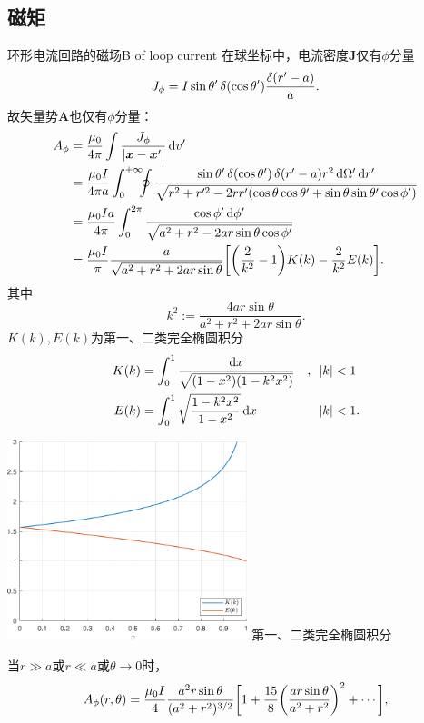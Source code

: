 \subsection{磁矩}
\begin{example}{环形电流回路的磁场}{B of loop current}
    在球坐标中，电流密度$\bm J$仅有$\phi$分量
    \[
        J_\phi=I\sin\theta'\mathop{}\!\delta(\cos\theta')\frac{\delta(r'-a)}a.
    \]
    故矢量势$\bm A$也仅有$\phi$分量：
    \begin{align*}
        A_\phi&=\frac{\mu_0}{4\pi}\int\frac{J_\phi}{|\bm x-\bm x'|}\d v'\\
        &=\frac{\mu_0I}{4\pi a}\int\zti\bs5\oint\frac{\sin\theta'\vd(\cos\theta')\vd(r'-a)r^2\d\Omega'\d r'}{\sqrt{r^2+r'^2-2rr'(\cos\theta\cos\theta'+\sin\theta\sin\theta'\cos\phi')}}\\
        &=\frac{\mu_0Ia}{4\pi}\int_0^{2\pi}\frac{\cos\phi'\d\phi'}{\sqrt{a^2+r^2-2ar\sin\theta\cos\phi'}}\\
        &=\frac{\mu_0I}\pi\frac{a}{\sqrt{a^2+r^2+2ar\sin\theta}}\biggfkh{\biggkh{\frac2{k^2}-1}K(k)-\frac2{k^2}E(k)}.%
    \end{align*}
    其中 
    \[
        k^2:=\frac{4ar\sin\theta}{a^2+r^2+2ar\sin\theta}.
    \]
    $K(k),E(k)$为第一、二类完全椭圆积分
    \begin{alignat*}{2}
        K(k)&=\int_0^1\frac{\mathop{}\!\mathrm{d} x}{\sqrt{(1-x^2)(1-k^2x^2)}}&,\enspace|k|&<1\\
        E(k)&=\int_0^1\sqrt{\frac{1-k^2x^2}{1-x^2}}\mathop{}\!\mathrm{d} x&|k|&<1.
    \end{alignat*}
    \begin{center}
        \includegraphics[width=7cm]{graphs/ellipseKE.pdf}
        \tikzchap 第一、二类完全椭圆积分
    \end{center}
    当$r\gg a$或$r\ll a$或$\theta\to 0$时，
    \[
        A_\phi(r,\theta)=\frac{\mu_0I}4\frac{a^2r\sin\theta}{(a^2+r^2)^{3/2}}\biggl[1+\frac{15}8\biggl(\frac{ar\sin\theta}{a^2+r^2}\biggr)^2+\cdots\biggr],
\]
\end{example}

